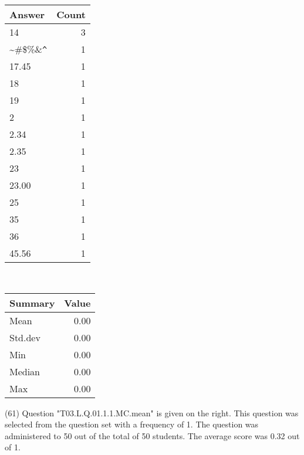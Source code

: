 \documentclass[12pt,english,nohyper]{tufte-handout}\usepackage[]{graphicx}\usepackage[]{color}
\begin{document}
\begin{center}%
\begin{tabular}{lr}
  \hline
Answer & Count \\ 
  \hline
14 &   3 \\ 
  \~{}\#\$\%\&\verb|^| &   1 \\ 
  17.45 &   1 \\ 
  18 &   1 \\ 
  19 &   1 \\ 
  2 &   1 \\ 
  2.34 &   1 \\ 
  2.35 &   1 \\ 
  23 &   1 \\ 
  23.00 &   1 \\ 
  25 &   1 \\ 
  35 &   1 \\ 
  36 &   1 \\ 
  45.56 &   1 \\ 
   \hline
\end{tabular}
~~~~~~~~%
\begin{tabular}{lr}
  \hline
Summary & Value \\ 
  \hline
Mean & 0.00 \\ 
  Std.dev & 0.00 \\ 
  Min & 0.00 \\ 
  Median & 0.00 \\ 
  Max & 0.00 \\ 
   \hline
\end{tabular}
\end{center}\newpage{} (61) Question "T03.L.Q.01.1.1.MC.mean" is given on the right. This question was selected from the question set with a frequency of 1. The question was administered to 50 out of the total of 50 students. The average score was 0.32 out of 1.
\end{document}
